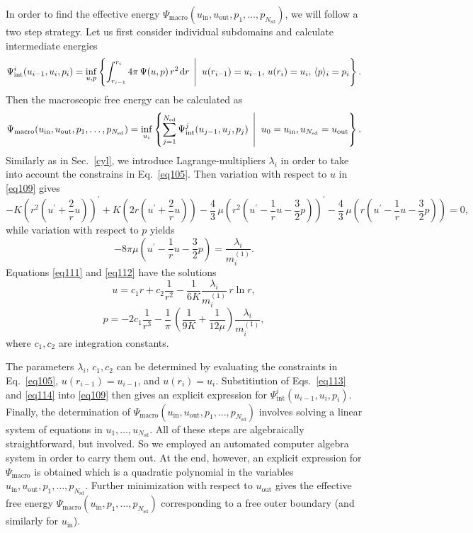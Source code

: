 \documentclass[final,1p,times]{elsarticle}
\newcommand{\be}{\begin{equation}}
\newcommand{\ee}{\end{equation}}
\def\dd{\;\!\mathrm{d}}
\renewcommand{\inf}[3]{
\underset{#1}{\mathrm{inf}}\left\lbrace #2 \; \left| \vphantom{#2}\vphantom{#3} \right. \; #3 \right\rbrace
}
\begin{document}
In order to find the effective energy $\Psi_\mathrm{macro}(u_\mathrm{in},u_\mathrm{out},p_1,\ldots,p_{N_\mathrm{sd}} )$, we will follow a two step strategy. Let us first consider individual subdomains and calculate intermediate energies
 \be
\label{eq109}
\Psi^i_\mathrm{int}(u_{i-1},u_i,p_i) 
 =
\inf{u,p}{\int_{r_{i-1}}^{r_i} 4\pi \, \Psi(u,p) \, r^2 \dd r}{u(r_{i-1})=u_{i-1},\,u(r_i)=u_i,\,\langle p \rangle_i=p_i}.
\ee
Then the macroscopic free energy can be calculated as 
\be
\label{eq110}
\Psi_\mathrm{macro}(u_\mathrm{in},u_\mathrm{out},p_1,\ldots,p_{N_\mathrm{sd}} ) 
 =
\inf{u_i}{\sum_{j=1}^{N_\mathrm{sd}} \Psi^j_\mathrm{int}(u_{j-1},u_j,p_j)}{u_0=u_\mathrm{in},u_{N_\mathrm{sd}}=u_\mathrm{out}}.
\ee
Similarly as in Sec.\ \ref{cyl}, we introduce Lagrange-multipliers $\lambda_i$ in order to take into account the constrains in Eq.\ \eqref{eq105}. Then variation with respect to $u$ in \eqref{eq109} gives
\be
\label{eq111}
- K \left( r^2 \left( u^\prime+\frac{2}{r}u\right) \right)^\prime + K \left( 2 r \left( u^\prime+\frac{2}{r}u\right) \right)
- \frac{4}{3}\, \mu \left( r^2 \left( u^\prime-\frac{1}{r}u-\frac{3}{2}p \right) \right)^\prime 
- \frac{4}{3}\, \mu \left( r \left( u^\prime-\frac{1}{r}u-\frac{3}{2}p \right) \right) = 0,
\ee
while variation with respect to $p$ yields
\be
\label{eq112}
- 8 \pi \mu \left( u^\prime-\frac{1}{r}u-\frac{3}{2}p \right) = \frac{\lambda_i}{m^{(1)}_i}.
\ee
Equations \eqref{eq111} and \eqref{eq112} have the solutions
\be
\label{eq113}
u = c_1 r + c_2 \frac{1}{r^2} - \frac{1}{6 K}\frac{\lambda_i}{m^{(1)}_i} \, r\ln{r},
\ee
\be
\label{eq114}
p =  - 2 c_1 \frac{1}{r^3} - \frac{1}{\pi} \, \left( \frac{1}{9 K} + \frac{1}{12 \mu} \right) \frac{\lambda_i}{m^{(1)}_i},
\ee
where $c_1, c_2$ are integration constants. 

The parameters $\lambda_i$, $c_1, c_2$ can be determined by evaluating the constraints in Eq.\ \eqref{eq105}, $u(r_{i-1})=u_{i-1}$, and $u(r_i)=u_i$. Substitiution of Eqs.\ \eqref{eq113} and \eqref{eq114} into \eqref{eq109} then gives an explicit expression for $\Psi^i_\mathrm{int}(u_{i-1},u_i,p_i)$. Finally, the determination of $\Psi_\mathrm{macro}(u_\mathrm{in},u_\mathrm{out},p_1,\ldots,p_{N_\mathrm{sd}} )$ involves solving a linear system of equations in $u_1, \ldots, u_{N_\mathrm{sd}}$.  All of these steps are algebraically straightforward, but involved. So we employed an automated computer algebra system in order to carry them out. 
At the end, however, an explicit expression for $\Psi_\mathrm{macro}$ is obtained which is a quadratic polynomial in the variables $u_\mathrm{in},u_\mathrm{out},p_1,\ldots,p_{N_\mathrm{sd}}$. Further minimization with respect to $u_\mathrm{out}$ gives the effective free energy $\Psi_\mathrm{macro}(u_\mathrm{in},p_1,\ldots,p_{N_\mathrm{sd}} )$ corresponding to a free outer boundary (and similarly for $u_\mathrm{in}$).
\end{document}
